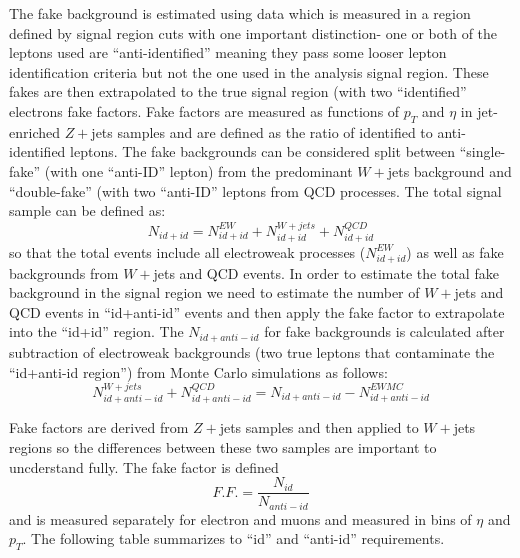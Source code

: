 The fake background is estimated using data which is measured in a region defined by signal region cuts with one important distinction- one or both of the leptons used are ``anti-identified'' meaning they pass some looser lepton identification criteria but not the one used in the analysis signal region. These fakes are then extrapolated to the true signal region (with two ``identified'' electrons fake factors. Fake factors are measured as functions of $p_T$ and $\eta$ in jet-enriched $Z+$jets samples and are defined as the ratio of identified to anti-identified leptons. The fake backgrounds can be considered split between ``single-fake'' (with one ``anti-ID'' lepton) from the predominant $W+$jets background and ``double-fake'' (with two ``anti-ID'' leptons from QCD processes. The total signal sample can be defined as: 
\begin{equation}
N_{id+id} = N^{EW}_{id+id}+N^{W+jets}_{id+id}+N^{QCD}_{id+id}
\end{equation} 
so that the total events include all electroweak processes ($N^{EW}_{id+id}$) as well as fake backgrounds from $W+$jets and QCD events. In order to estimate the total fake background in the signal region we need to estimate the number of $W+$jets and QCD events in ``id+anti-id'' events and then apply the fake factor to extrapolate into the ``id+id'' region. The $N_{id+anti-id}$ for fake backgrounds is calculated after subtraction of electroweak backgrounds (two true leptons that contaminate the ``id+anti-id region'') from Monte Carlo simulations as follows:
\begin{equation}
N^{W+jets}_{id+anti-id}+N^{QCD}_{id+anti-id}=N_{id+anti-id}-N^{EW MC}_{id+anti-id}
\end{equation}
 
Fake factors are derived from $Z+$jets samples and then applied to $W+$jets regions so the differences between these two samples are important to uncderstand fully. The fake factor is defined 
\begin{equation}
F.F. = \frac{N_{id}}{N_{anti-id}}
\end{equation}
and is measured separately for electron and muons and measured in bins of $\eta$ and $p_T$. The following table summarizes to ``id'' and ``anti-id'' requirements. 

